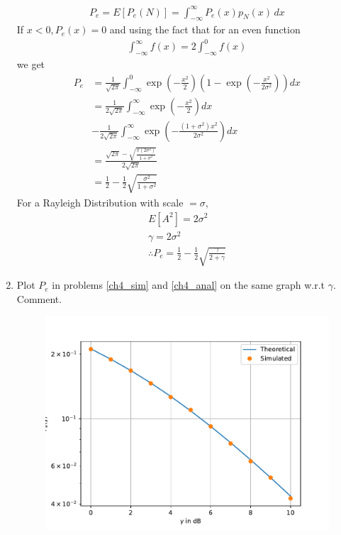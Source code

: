 \documentclass[10pt, a4paper]{article}
\providecommand{\sbrak}[1]{\ensuremath{{}\left[#1\right]}}
\providecommand{\brak}[1]{\ensuremath{\left(#1\right)}}
\begin{document}
\begin{enumerate}
\begin{align}
 P_e=E\sbrak{P_e(N)} = \int_{-\infty}^{\infty}P_e(x)p_{N}(x)\, dx  
\end{align}
If $x<0, P_e(x)=0$ and using the fact that for an even function
\begin{align}
\int_{-\infty}^{\infty}f(x)=2\int_{-\infty}^{0}f(x)   
\end{align}
we get
\begin{align}
  P_e&= \frac{1}{\sqrt{2\pi}}\int_{-\infty}^{0}\exp \brak{ -\frac{x^2}{2}} \brak{1-\exp \brak{ -\frac{x^2}{2\sigma^2}} } dx\\
&= \frac{1}{2\sqrt{2\pi}} \int_{-\infty}^{\infty} \exp \brak{ -\frac{x^2}{2} }dx \nonumber \\
&- \frac{1}{2\sqrt{2\pi}} \int_{-\infty}^{\infty} \exp \brak{-\frac{(1+ \sigma^2)x^2}{2 \sigma^2}}  dx\\
&= \frac{\sqrt{2\pi} - \sqrt{\frac{\pi(2\sigma^2)}{1+\sigma^2}}}{2\sqrt{2\pi}}\\
&= \frac{1}{2} - \frac{1}{2}\sqrt{\frac{\sigma^2}{1+\sigma^2}}
\end{align}
For a Rayleigh Distribution with scale $= \sigma$,
\begin{align}
E\sbrak{A^2} = 2\sigma^2\\
\gamma = 2\sigma^2\\
\therefore P_e = \frac{1}{2} - \frac{1}{2}\sqrt{\frac{\gamma}{2+\gamma}}
\end{align}
%
%
\item
Plot $P_e$ in problems \ref{ch4_sim} and \ref{ch4_anal} on the same graph w.r.t $\gamma$.  Comment.
\\
\begin{center}
\end{center}
\begin{figure}[!ht]
\centering
\includegraphics[scale=0.5]{images/7.2.pdf}
\end{figure}
\end{enumerate}
\end{document}
